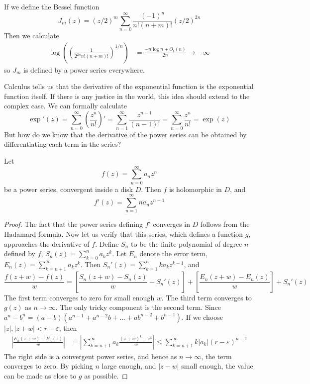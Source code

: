 \begin{example}
    If we define the Bessel function
    \[ J_m(z) = (z/2)^m \sum_{n = 0}^\infty \frac{(-1)^n}{n! (n+m)!} (z/2)^{2n} \]
    Then we calculate
    \begin{align*}
        \log \left( \left( \frac{1}{2^{2n} n! (n+m)!} \right)^{1/n} \right) &=  \frac{-n \log n + O_t(n)}{2n} \to -\infty
    \end{align*}
    so $J_m$ is defined by a power series everywhere.
\end{example}

Calculus tells us that the derivative of the exponential function is the exponential function itself. If there is any justice in the world, this idea should extend to the complex case. We can formally calculate
%
\[ \exp'(z) = \sum_{n = 0}^\infty \left( \frac{z^n}{n!} \right)' = \sum_{n = 1}^\infty \frac{z^{n-1}}{(n-1)!} = \sum_{n = 0}^\infty \frac{z^n}{n!} = \exp(z) \]
%
But how do we know that the derivative of the power series can be obtained by differentiating each term in the series?

\begin{theorem}
    Let
    \[ f(z) = \sum_{n = 0}^\infty a_n z^n \]
    be a power series, convergent inside a disk $D$. Then $f$ is holomorphic in $D$, and
    \[ f'(z) = \sum_{n = 1}^\infty n a_n z^{n-1} \]
\end{theorem}
\begin{proof}
    The fact that the power series defining $f'$ converges in $D$ follows from the Hadamard formula. Now let us verify that this series, which defines a function $g$, approaches the derivative of $f$. Define $S_n$ to be the finite polynomial of degree $n$ defined by $f$, $S_n(z) = \sum_{k = 0}^n a_k z^k$. Let $E_n$ denote the error term, $E_n(z) = \sum_{k = n+1}^\infty a_k z^k$. Then $S_n'(z) = \sum_{k = 1}^n k a_k z^{k-1}$, and
    \[ \frac{f(z + w) - f(z)}{w} = \left[ \frac{S_n(z + w) - S_n(z)}{w} - S_n'(z) \right] + \left[ \frac{E_n(z + w) - E_n(z)}{w} \right] + S_n'(z) \]
    The first term converges to zero for small enough $w$. The third term converges to $g(z)$ as $n \to \infty$. The only tricky component is the second term. Since $a^n - b^n = (a - b)(a^{n-1} + a^{n-2}b + \dots + ab^{n-2} + b^{n-1})$. If we choose $|z|, |z + w| < r - \varepsilon$, then
    \begin{align*}
        \left| \frac{E_n(z + w) - E_n(z)}{w} \right| &= \left| \sum_{k = n + 1}^\infty a_k \frac{(z + w)^k - z^k}{w} \right| \leq \sum_{k = n + 1}^\infty k |a_k| (r - \varepsilon)^{n-1}
    \end{align*}
    The right side is a convergent power series, and hence as $n \to \infty$, the term converges to zero. By picking $n$ large enough, and $|z - w|$ small enough, the value can be made as close to $g$ as possible.
\end{proof}

